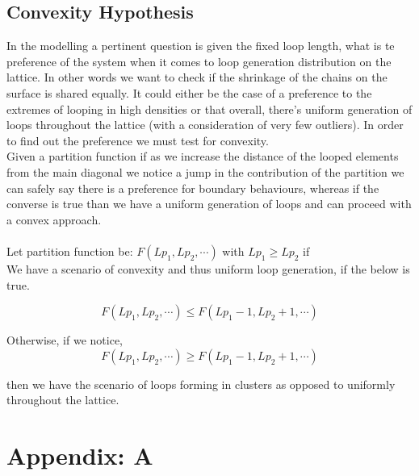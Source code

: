 \documentclass[10pt,letterpaper]{article}
\begin{document}
\subsection{Convexity Hypothesis}
In the modelling a pertinent question is given the fixed loop length, what is te preference of the system when it comes to loop generation distribution on the lattice. In other words we want to check if the shrinkage of the chains on the surface is shared equally. It could either be the case of a preference to the extremes of looping in high densities or that overall, there's uniform generation of loops throughout the lattice (with a consideration of very few outliers). In order to find out the preference we must test for convexity.\\

\noindent Given a partition function if as we increase the distance of the looped elements from the main diagonal we notice a jump in the contribution of the partition we can safely say there is a preference for boundary behaviours, whereas if the converse is true than we have a uniform generation of loops and can proceed with a convex approach.\\\\

\noindent Let partition function be: $F(Lp_1,Lp_2, \cdots)$ with $Lp_1\geq Lp_2$ if\\

\noindent We have a scenario of convexity and thus uniform loop generation, if the below is true.

$$F(Lp_1,Lp_2, \cdots)\leq F(Lp_1-1,Lp_2+1, \cdots)$$

\noindent Otherwise, if we notice,
$$F(Lp_1,Lp_2, \cdots)\geq F(Lp_1-1,Lp_2+1, \cdots)$$ 

\noindent then we have the scenario of loops forming in clusters as opposed to uniformly throughout the lattice.



 






\newpage
\section{Appendix: A}
\end{document}
